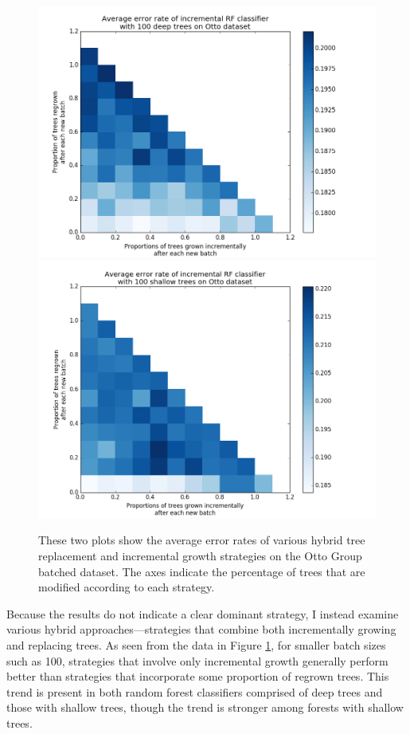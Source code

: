 \begin{figure}
  \centering
  \includegraphics[width=5.0in]{otto_deep_med}\\
  \includegraphics[width=5.0in]{otto_shallow_med}
  \caption{These two plots show the average error rates of various hybrid tree
  replacement and incremental growth strategies on the Otto Group batched
dataset. The axes indicate the percentage of trees that are modified according
to each strategy.}
  \label{fig:ottohybrid}
\end{figure}

Because the results do not indicate a clear dominant strategy, I instead
examine various hybrid approaches---strategies that combine both incrementally
growing and replacing trees.  As seen from the data in Figure
\ref{fig:ottohybrid}, for smaller batch sizes such as 100, strategies that
involve only incremental growth generally perform better than strategies that
incorporate some proportion of regrown trees. This trend is present in both
random forest classifiers comprised of deep trees and those with shallow trees,
though the trend is stronger among forests with shallow trees. 

